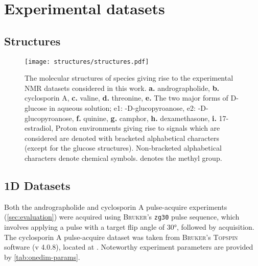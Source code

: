 

\section{Experimental datasets}

\subsection{Structures}

\begin{figure}[H]
    \centering
    \texttt{[image: structures/structures.pdf]}
    \caption[
        The molecular structures of species giving rise to the experimental
        \acs{NMR} datasets considered in this work.
    ]{
        The molecular structures of species giving rise to the experimental
        \acs{NMR} datasets considered in this work.
        \textbf{a.} andrographolide,
        \textbf{b.} cyclosporin A,
        \textbf{c.} valine,
        \textbf{d.} threonine,
        \textbf{e.} The two major forms of D-glucose in aqueous solution;
            e1: \textalpha-D-glucopyroanose,
            e2: \textbeta-D-glucopyroanose,
        \textbf{f.} quinine,
        \textbf{g.} camphor,
        \textbf{h.} dexamethasone,
        \textbf{i.} 17\textbeta-estradiol,
        Proton environments giving rise to signals which are considered are
        denoted with bracketed alphabetical characters (except for the glucose
        structures). Non-bracketed alphabetical characters denote chemical
        symbols.  denotes the methyl group.
    }
    \label{fig:structures}
\end{figure}

\subsection{\acs{1D} Datasets}

Both the andrographolide and cyclosporin A pulse-acquire experiments
(\cref{sec:evaluation}) were acquired using \textsc{Bruker}'s \texttt{zg30}
pulse sequence, which involves applying a pulse with a target flip angle of
\ang{30}, followed by acquisition.  The cyclosporin A pulse-acquire dataset was
taken from \textsc{Bruker}'s \textsc{Topspin} software (v 4.0.8), located at
.  Noteworthy experiment
parameters are provided by \cref{tab:onedim-params}.

